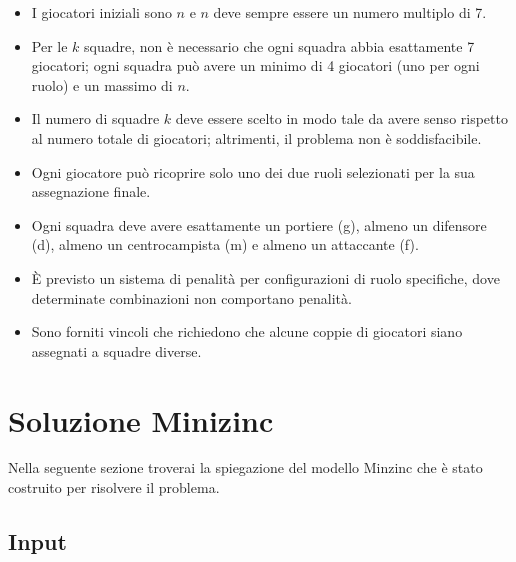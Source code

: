 \documentclass{article}
\begin{document}
\begin{multicols*}{2}
\begin{itemize}
    \item I giocatori iniziali sono \( n \) e \( n \) deve sempre essere un numero multiplo di 7.
    \item Per le \( k \) squadre, non è necessario che ogni squadra abbia esattamente 7 giocatori; ogni squadra può avere un minimo di 4 giocatori (uno per ogni ruolo) e un massimo di \( n \).
    \item Il numero di squadre \( k \) deve essere scelto in modo tale da avere senso rispetto al numero totale di giocatori; altrimenti, il problema non è soddisfacibile.
    \item Ogni giocatore può ricoprire solo uno dei due ruoli selezionati per la sua assegnazione finale.
    \item Ogni squadra deve avere esattamente un portiere (g), almeno un difensore (d), almeno un centrocampista (m) e almeno un attaccante (f).
    \item È previsto un sistema di penalità per configurazioni di ruolo specifiche, dove determinate combinazioni non comportano penalità.
    \item Sono forniti vincoli che richiedono che alcune coppie di giocatori siano assegnati a squadre diverse.
\end{itemize}

\section{Soluzione Minizinc}
Nella seguente sezione troverai la spiegazione del modello Minzinc che è stato costruito per risolvere il problema.

\subsection{Input}


\end{multicols*}
\end{document}
